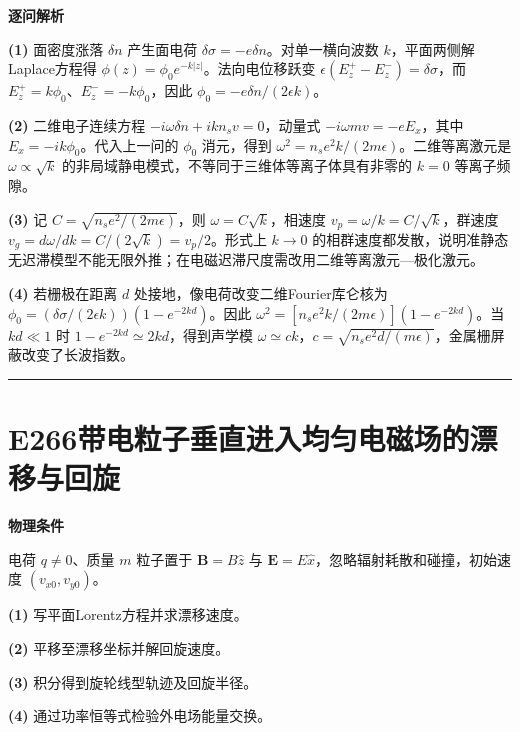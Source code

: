 \documentclass[UTF8,a4paper,11pt,oneside,openany]{ctexbook}
\begin{document}
\par\medskip\noindent\textbf{逐问解析}
\par\noindent\textbf{(1)} 面密度涨落 \(\delta n\) 产生面电荷 \(\delta\sigma=-e\delta n\)。对单一横向波数 \(k\)，平面两侧解Laplace方程得 \(\phi(z)=\phi_0e^{-k|z|}\)。法向电位移跃变 \(\epsilon(E_z^+-E_z^-)=\delta\sigma\)，而 \(E_z^+=k\phi_0\)、\(E_z^-=-k\phi_0\)，因此 \(\phi_0=-e\delta n/(2\epsilon k)\)。
\par\noindent\textbf{(2)} 二维电子连续方程 \(-i\omega\delta n+ikn_sv=0\)，动量式 \(-i\omega mv=-eE_x\)，其中 \(E_x=-ik\phi_0\)。代入上一问的 \(\phi_0\) 消元，得到 \(\omega^2=n_se^2k/(2m\epsilon)\)。二维等离激元是 \(\omega\propto\sqrt k\) 的非局域静电模式，不等同于三维体等离子体具有非零的 \(k=0\) 等离子频隙。
\par\noindent\textbf{(3)} 记 \(C=\sqrt{n_se^2/(2m\epsilon)}\)，则 \(\omega=C\sqrt k\)，相速度 \(v_p=\omega/k=C/\sqrt k\)，群速度 \(v_g=d\omega/dk=C/(2\sqrt k)=v_p/2\)。形式上 \(k\to0\) 的相群速度都发散，说明准静态无迟滞模型不能无限外推；在电磁迟滞尺度需改用二维等离激元—极化激元。
\par\noindent\textbf{(4)} 若栅极在距离 \(d\) 处接地，像电荷改变二维Fourier库仑核为 \(\phi_0=(\delta\sigma/(2\epsilon k))(1-e^{-2kd})\)。因此 \(\omega^2=[n_se^2k/(2m\epsilon)](1-e^{-2kd})\)。当 \(kd\ll1\) 时 \(1-e^{-2kd}\simeq2kd\)，得到声学模 \(\omega\simeq ck\)，\(c=\sqrt{n_se^2d/(m\epsilon)}\)，金属栅屏蔽改变了长波指数。

\par\bigskip\hrule\bigskip
\section*{E266\quad 带电粒子垂直进入均匀电磁场的漂移与回旋}
\textbf{物理条件}\par 电荷 \(q\ne0\)、质量 \(m\) 粒子置于 \(\boldsymbol B=B\hat z\) 与 \(\boldsymbol E=E\hat x\)，忽略辐射耗散和碰撞，初始速度 \((v_{x0},v_{y0})\)。
\par\noindent\textbf{(1)} 写平面Lorentz方程并求漂移速度。
\par\noindent\textbf{(2)} 平移至漂移坐标并解回旋速度。
\par\noindent\textbf{(3)} 积分得到旋轮线型轨迹及回旋半径。
\par\noindent\textbf{(4)} 通过功率恒等式检验外电场能量交换。
\end{document}
